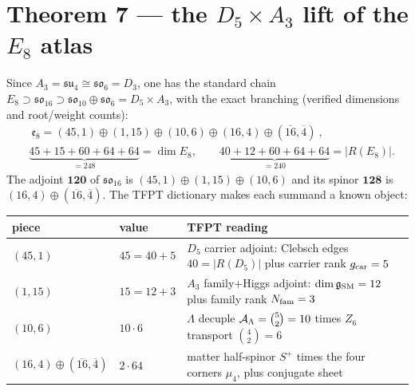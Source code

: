 \section*{Theorem 7 --- the $D_5\times A_3$ lift of the $E_8$ atlas}
Since $A_3=\mathfrak{su}_4\cong\mathfrak{so}_6=D_3$, one has the standard chain
$E_8\supset \mathfrak{so}_{16}\supset \mathfrak{so}_{10}\oplus\mathfrak{so}_6=D_5\times A_3$, with the
exact branching (verified dimensions and root/weight counts):
\begin{equation}
\begin{aligned}
  &\boxed{\ \mathfrak e_8=(45,1)\oplus(1,15)\oplus(10,6)\oplus(16,4)\oplus(\overline{16},\overline4)\ },\\
  &\underbrace{45{+}15{+}60{+}64{+}64}_{=248}=\dim E_8,\qquad
  \underbrace{40{+}12{+}60{+}64{+}64}_{=240}=|R(E_8)| .
\end{aligned}
\end{equation}
The adjoint $\mathbf{120}$ of $\mathfrak{so}_{16}$ is $(45,1)\oplus(1,15)\oplus(10,6)$ and its spinor
$\mathbf{128}$ is $(16,4)\oplus(\overline{16},\overline4)$. The TFPT dictionary makes each summand a
known object:
\begin{center}\small
\begin{tabularx}{\linewidth}{@{}llY@{}}
\toprule
piece & value & TFPT reading \\
\midrule
$(45,1)$ & $45=40+5$ & $D_5$ carrier adjoint: Clebsch edges $40=|R(D_5)|$ plus carrier rank $g_{\mathrm{car}}=5$ \\
$(1,15)$ & $15=12+3$ & $A_3$ family$+$Higgs adjoint: $\dim\mathfrak g_{\mathrm{SM}}=12$ plus family rank $N_{\mathrm{fam}}=3$ \\
$(10,6)$ & $10\cdot6$ & $\Lambda$ decuple $\mathcal A_\Lambda=\binom52=10$ times $Z_6$ transport $\binom42=6$ \\
$(16,4)\oplus(\overline{16},\overline4)$ & $2\cdot64$ & matter half-spinor $S^+$ times the four corners $\mu_4$, plus conjugate sheet \\
\bottomrule
\end{tabularx}
\end{center}

